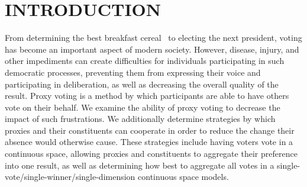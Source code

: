 %
%

\chapter{INTRODUCTION}\label{ch:introduction}
\thispagestyle{empty}
From determining the best breakfast cereal~\cite{Curtis2021} to electing the next
president, voting has become an important aspect of modern society.
However, disease, injury, and other impediments can create difficulties for individuals
participating in such democratic processes, preventing them from expressing their
voice and participating in deliberation, as well as decreasing the overall quality of
the result.
Proxy voting is a method by which participants are able to have others vote on their
behalf.
We examine the ability of proxy voting to decrease the impact of such frustrations.
We additionally determine strategies by which proxies and their constituents can
cooperate in order to reduce the change their absence would otherwise cause.
These strategies include having voters vote in a continuous space, allowing proxies
and constituents to aggregate their preference into one result, as well as
determining how best to aggregate all votes in a
single-vote/single-winner/single-dimension continuous space models.










